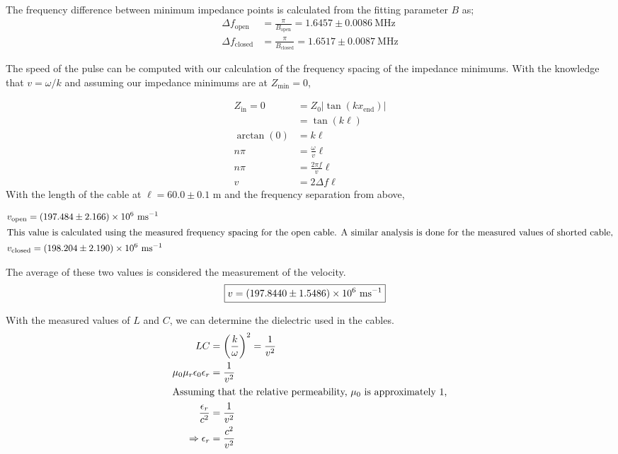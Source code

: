 The frequency difference between minimum impedance points is calculated from the fitting parameter $B$ as;
\begin{align}
    \Delta f_\text{open} &= \frac{\pi}{B_\text{open}} = 1.6457 \pm 0.0086  \ \text{MHz} \\
    \Delta f_\text{closed} &= \frac{\pi}{B_\text{closed}} = 1.6517 \pm 0.0087 \ \text{MHz}
\end{align}

The speed of the pulse can be computed with our calculation of the frequency spacing of the impedance minimums. With the knowledge that $v = \omega/k$ and assuming our impedance minimums are at $Z_\text{min} = 0$,

\begin{align}
    Z_\text{in} = 0 &= Z_0 |\tan(k x_\text{end})| \\
    &= \tan(k \ell) \\
    \arctan(0) &= k\ell \\
    n\pi &= \frac{\omega}{v} \ell\\
    n\pi &= \frac{2\pi f}{v} \ell\\
    v &= 2\Delta f \ell
\end{align}
With the length of the cable at $\ell = 60.0 \pm 0.1$ m and the frequency separation from above,

\begin{align} 
    & { v_\text{open} = (197.484 \pm 2.166 ) \times 10^{6} \ \text{ms$^{-1}$} } \label{open_vel} \\
    \intertext{This value is calculated using the measured frequency spacing for the open cable. A similar analysis is done for the measured values of shorted cable,}
    & { v_\text{closed} = (198.204 \pm 2.190 ) \e{6} \ \text{ms$^{-1}$} } \label{closed_vel} 
\end{align}

The average of these two values is considered the measurement of the velocity.
\begin{align}
    &\boxed{ v = (197.8440 \pm 1.5486) \times10^{6} \ \text{ms$^{-1}$} } \label{eqn:velocity}
\end{align}

With the measured values of $L$ and $C$, we can determine the dielectric used in the cables.
\begin{align}
    LC &= \left( \frac{k}{\omega}  \right)^2 = \frac{1}{v^2} \\
    \mu_0 \mu_r \epsilon_0 \epsilon_r &= \frac1{v^2} \\
    \shortintertext{Assuming that the relative permeability, $\mu_0$ is approximately 1,}
    \frac{\epsilon_r}{c^2} &= \frac1{v^2} \\
    \Rightarrow \epsilon_r &= \frac{c^2}{v^2}
\end{align}

